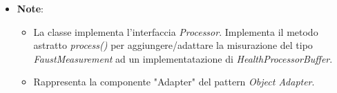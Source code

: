 \begin{itemize}
\begin{itemize}
\begin{itemize}
    \end{itemize}
    \item\textbf{Note}:
        \begin{itemize}
            \item La classe implementa l'interfaccia \textit{Processor}. Implementa il metodo astratto \textit{process()} per aggiungere/adattare la misurazione del tipo \textit{FaustMeasurement} ad un implementatazione di \textit{HealthProcessorBuffer}.
            \item Rappresenta la componente "Adapter" del pattern \textit{Object Adapter}.
        \end{itemize}
    \end{itemize}
\end{itemize}
